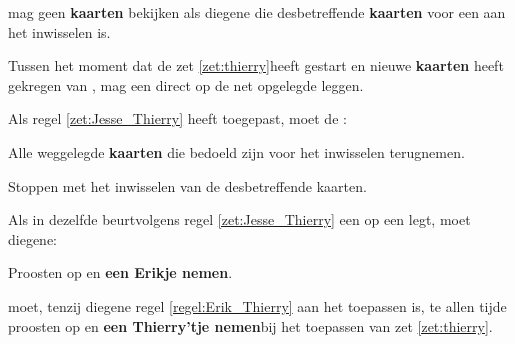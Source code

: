 \vervolgLijst{}
\item \Frits mag geen \textbf{kaarten} bekijken als diegene die desbetreffende \textbf{kaarten} voor een \andereSpeler aan het inwisselen is.
\eindLijst{}



\vervolgLijst{}
\item \label{zet:Jesse_Thierry} Tussen het moment dat de \huidigeSpeler zet \ref{zet:thierry}\footnotemark[1] heeft gestart en nieuwe \textbf{kaarten} heeft gekregen van \FritsN, mag \eenSpeler een \footnotemark[4] direct op de net opgelegde \footnotemark[5] leggen.
\eindLijst{}

\vervolgLijst{}
\item \label{zet:Jesse_Thierry_2} Als \eenSpeler regel \ref{zet:Jesse_Thierry} heeft toegepast, moet de \huidigeSpelerN:
\puntLijst{}
\item Alle weggelegde \textbf{kaarten} die bedoeld zijn voor het inwisselen terugnemen.
\item Stoppen met het inwisselen van de desbetreffende kaarten.
\eindPuntLijst{}
\eindLijst{}

\vervolgLijst{}
\item \label{regel:Erik_Thierry} Als \eenSpeler in dezelfde beurt\footnotemark[6] volgens regel \ref{zet:Jesse_Thierry} een \footnotemark[4] op een \footnotemark[5] legt, moet diegene:
\puntLijst{}
\item Proosten op  en \textbf{een Erikje nemen}\footnotemark[7].
\eindPuntLijst{}
\eindLijst{}

\vervolgLijst{}
\item \label{regel:Erik_Thierry_2} \EenSpeler moet, tenzij diegene regel \ref{regel:Erik_Thierry} aan het toepassen is, te allen tijde proosten op  en \textbf{een Thierry'tje nemen}\footnotemark[6] bij het toepassen van zet \ref{zet:thierry}\footnotemark[1].
\eindLijst{}

